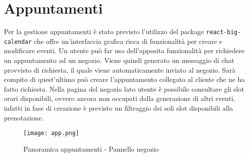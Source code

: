 \section{Appuntamenti}
Per la gestione appuntamenti è stato previsto l'utilizzo del package \lstinline[basicstyle=\ttfamily]!react-big-calendar! che offre un'interfaccia grafica ricca di funzionalità per creare e modificare eventi. Un utente può far uso dell'apposita funzionalità per richiedere un appuntamento ad un negozio. Viene quindi generato un messaggio di chat provvisto di richiesta, il quale viene automaticamente inviato al negozio. Sarà compito di quest'ultimo può creare l'appuntamento collegato al cliente che ne ha fatto richiesta. Nella pagina del negozio lato utente è possibile consultare gli slot orari disponibili, ovvero ancora non occupati dalla generazione di altri eventi, infatti in fase di creazione è previsto un filtraggio dei soli slot disponibili alla prenotazione.  
\begin{figure}[h!]
    \centering
    \texttt{[image: app.png]}
    \caption{Panoramica appuntamenti - Pannello negozio}
\end{figure}
\FloatBarrier